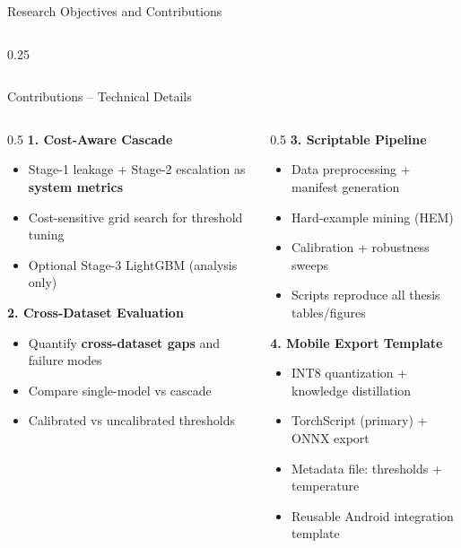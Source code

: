 \documentclass[aspectratio=169,12pt]{beamer}
\newcommand{\highlight}[1]{\textcolor{primaryblue}{\textbf{#1}}}
\newcommand{\alerttext}[1]{\textcolor{alertred}{\textbf{#1}}}
\begin{document}
\begin{frame}{Research Objectives and Contributions}
\begin{columns}[T]
\begin{column}{0.25\textwidth}
\end{column}
\end{columns}
\end{frame}

\begin{frame}{Contributions – Technical Details}
\small
\begin{columns}[T]
\begin{column}{0.5\textwidth}
\textbf{1. Cost-Aware Cascade}
\begin{itemize}
\setlength\itemsep{0.03em}
    \item Stage-1 leakage + Stage-2 escalation as \highlight{system metrics}
    \item Cost-sensitive grid search for threshold tuning
    \item Optional Stage-3 LightGBM (analysis only)
\end{itemize}

\textbf{2. Cross-Dataset Evaluation}
\begin{itemize}
\setlength\itemsep{0.03em}
    \item Quantify \alerttext{cross-dataset gaps} and failure modes
    \item Compare single-model vs cascade
    \item Calibrated vs uncalibrated thresholds
\end{itemize}
\end{column}

\begin{column}{0.5\textwidth}
\textbf{3. Scriptable Pipeline}
\begin{itemize}
\setlength\itemsep{0.03em}
    \item Data preprocessing + manifest generation
    \item Hard-example mining (HEM)
    \item Calibration + robustness sweeps
    \item Scripts reproduce all thesis tables/figures
\end{itemize}


\textbf{4. Mobile Export Template}
\begin{itemize}
\setlength\itemsep{0.03em}
    \item INT8 quantization + knowledge distillation
    \item TorchScript (primary) + ONNX export
    \item Metadata file: thresholds + temperature
    \item Reusable Android integration template
\end{itemize}
\end{column}
\end{columns}


\end{frame}
\end{document}
